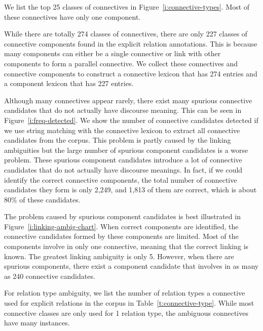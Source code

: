 




We list the top 25 classes of connectives in Figure~\ref{i:connective-types}.
Most of these connectives have only one component.



While there are totally 274 classes of connectives, there are only 227 classes
of connective components found in the explicit relation annotations. This
is because many components can either be a single connective or link
with other components to form a parallel connective. We collect these
connectives and connective components to construct a connective lexicon
that has 274 entries and a component lexicon that has 227 entries.


Although many connectives appear rarely, there exist many spurious connective
candidates that do not actually have discourse meaning. This can be seen in
Figure~\ref{i:freq-detected}. We show the number of connective candidates
detected if we use string matching with the connective lexicon to extract
all connective candidates from the corpus. This problem is partly caused by the linking
ambiguities but the large number of spurious component candidates is a worse problem.
These spurious component candidates introduce a lot of connective candidates that
do not actually have discourse meanings. In fact, if we could identify the correct
connective components, the total number of connective candidates they form
is only 2,249, and 1,813 of them are correct, which is about 80\% of these candidates.



The problem caused by spurious component candidates is best illustrated in
Figure~\ref{i:linking-ambig-chart}. When correct components are identified,
the connective candidates formed by these components are limited.
Most of the components involve in only one connective, meaning that the correct linking
is known. The greatest linking ambiguity is only 5. However, when there are
spurious components, there exist a component candidate that involves in as many
as 240 connective candidates.



For relation type ambiguity, we list the number of relation types a
connective used for explicit relations in the corpus in Table~\ref{t:connective-type}.
While most connective classes are only used for 1 relation type,
the ambiguous connectives have many instances.


